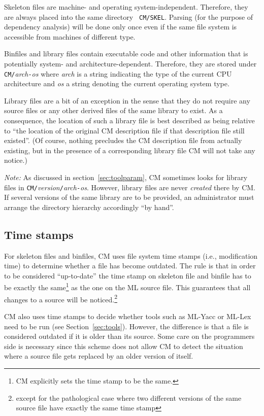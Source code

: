 \documentclass[titlepage,letterpaper]{article}
\begin{document}
Skeleton files are machine- and operating system-independent.
Therefore, they are always placed into the same directory {\tt
CM/SKEL}. Parsing (for the purpose of dependency analysis) will be
done only once even if the same file system is accessible from
machines of different type.

Binfiles and library files contain executable code and other
information that is potentially system- and architecture-dependent.
Therefore, they are stored under {\tt CM/}{\it arch}{\tt -}{\it os}
where {\it arch} is a string indicating the type of the current
CPU architecture and {\it os} a string denoting the current operating
system type.

Library files are a bit of an exception in the sense that they do not
require any source files or any other derived files of the same
library to exist.  As a consequence, the location of such a library
file is best described as being relative to ``the location of the
original CM description file if that description file still existed''.
(Of course, nothing precludes the CM description file from actually
existing, but in the presence of a corresponding library file CM will
not take any notice.)

{\em Note:} As discussed in section~\ref{sec:toolparam}, CM sometimes
looks for library files in
{\tt CM/}{\it version}{\tt /}{\it arch}{\tt -}{\it os}.
However, library files are never {\em created} there by CM.  If
several versions of the same library are to be provided, an
administrator must arrange the directory hierarchy accordingly ``by
hand''.

\subsection{Time stamps}

For skeleton files and binfiles, CM uses file system time stamps
(i.e., modification time) to determine whether a file has become
outdated.  The rule is that in order to be considered ``up-to-date''
the time stamp on skeleton file and binfile has to be exactly the
same\footnote{CM explicitly sets the time stamp to be the same.} as
the one on the ML source file.  This guarantees that all changes to a
source will be noticed.\footnote{except for the pathological case where
two different versions of the same source file have exactly the same
time stamp}

CM also uses time stamps to decide whether tools such as ML-Yacc or
ML-Lex need to be run (see Section~\ref{sec:tools}).  However, the
difference is that a file is considered outdated if it is older than
its source.  Some care on the programmers side is necessary since this
scheme does not allow CM to detect the situation where a source file
gets replaced by an older version of itself.
\end{document}
